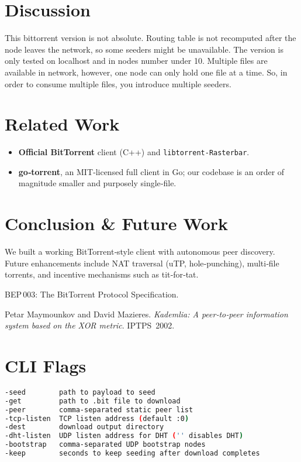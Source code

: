 \documentclass[11pt,a4paper]{article}
\begin{document}
\section{Discussion}
This bittorrent version is not absolute. Routing table is not recomputed after the node leaves the network, so some seeders might be unavailable.
The version is only tested on localhost and in nodes number under 10. Multiple files are available in network, however, one node
can only hold one file at a time. So, in order to consume multiple files, you introduce multiple seeders.


\section{Related Work}
\begin{itemize}
  \item \textbf{Official BitTorrent} client (C++) and \texttt{libtorrent‑Rasterbar}.  
  \item \textbf{go‑torrent}, an MIT‑licensed full client in Go; our codebase is an order of magnitude smaller and purposely single‑file.
\end{itemize}

\section{Conclusion \& Future Work}
We built a working BitTorrent‑style client with autonomous peer discovery.
Future enhancements include NAT traversal (uTP, hole‑punching), multi‑file torrents, and incentive mechanisms such as tit‑for‑tat.

\clearpage

\begin{thebibliography}{9}
BEP\,003: The BitTorrent Protocol Specification.

Petar Maymounkov and David Mazieres. \emph{Kademlia: A peer‑to‑peer information system based on the XOR metric}. IPTPS 2002.
\end{thebibliography}

\appendix
\section{CLI Flags}\label{app:cli}
\begin{lstlisting}[language=bash]
-seed        path to payload to seed
-get         path to .bit file to download
-peer        comma-separated static peer list
-tcp-listen  TCP listen address (default :0)
-dest        download output directory
-dht-listen  UDP listen address for DHT ('' disables DHT)
-bootstrap   comma-separated UDP bootstrap nodes
-keep        seconds to keep seeding after download completes
\end{lstlisting}
\end{document}
